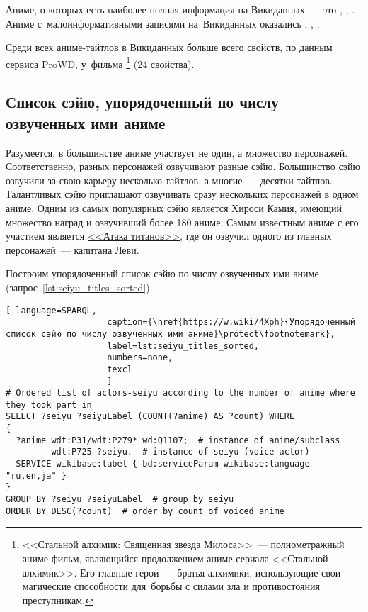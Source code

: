Аниме, о которых есть наиболее полная информация на Викиданных~--- 
это , , 
. 
Аниме с~малоинформативными записями на~Викиданных оказались 
, 
, 
.

Среди всех аниме-тайтлов в Викиданных больше всего свойств, 
по данным сервиса ProWD, %
у~фильма \footnote{%
%
    <<Стальной алхимик: Священная звезда Милоса>>~--- полнометражный аниме-фильм, 
    являющийся продолжением аниме-сериала <<Стальной алхимик>>. 
    Его главные герои~--- братья-алхимики, 
    использующие свои магические способности 
    для~борьбы с силами зла и противостояния преступникам.%
} (\num{24} свойства).



\subsection{Список сэйю, упорядоченный по числу озвученных ими аниме}

Разумеется, в большинстве аниме участвует не один, а множество персонажей. 
Соответственно, разных персонажей озвучивают разные сэйю. 
Большинство сэйю озвучили за свою карьеру несколько тайтлов, 
а многие~--- десятки тайтлов. 
Талантливых сэйю приглашают озвучивать сразу нескольких персонажей в одном аниме. Одним из самых популярных сэйю является \href{https://w.wiki/4L5q}{Хироси Камия}, имеющий множество наград и озвучивший более 180 аниме. Самым известным аниме с его участием является \href{https://w.wiki/4L5r}{<<Атака титанов>>}, где он озвучил одного из главных персонажей~--- капитана Леви.

Построим упорядоченный список сэйю по числу озвученных ими аниме (запрос~\ref{lst:seiyu_titles_sorted}).

\newpage
{}
\begin{lstlisting}[ language=SPARQL, 
                    caption={\href{https://w.wiki/4Xph}{Упорядоченный список сэйю по числу озвученных ими аниме}\protect\footnotemark},
                    label=lst:seiyu_titles_sorted,
                    numbers=none,
                    texcl 
                    ]
# Ordered list of actors-seiyu according to the number of anime where they took part in
SELECT ?seiyu ?seiyuLabel (COUNT(?anime) AS ?count) WHERE
{
  ?anime wdt:P31/wdt:P279* wd:Q1107;  # instance of anime/subclass
         wdt:P725 ?seiyu.  # instance of seiyu (voice actor)
  SERVICE wikibase:label { bd:serviceParam wikibase:language "ru,en,ja" }
}
GROUP BY ?seiyu ?seiyuLabel  # group by seiyu 
ORDER BY DESC(?count)  # order by count of voiced anime
\end{lstlisting}%




